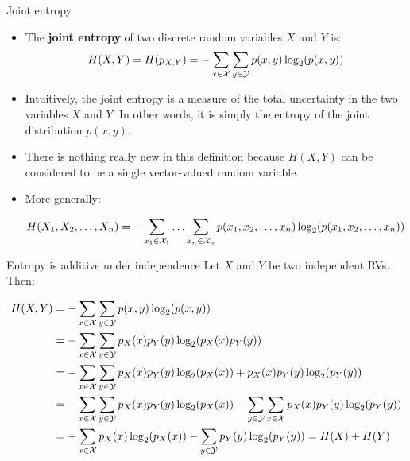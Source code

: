 \begin{vbframe} {Joint entropy}
\begin{itemize}
  \item The \textbf{joint entropy} of two discrete random variables $X$ and $Y$ is:
    $$ H(X,Y) = H(p_{X,Y}) = - \sum_{x \in \mathcal{X}} \sum_{y \in \mathcal{Y}}  p(x,y) \log_2(p(x,y))$$
  \item Intuitively, the joint entropy is a measure of the total uncertainty in the two variables $X$ and $Y$. In other words, it is simply the entropy of the joint distribution $p(x,y)$.
  \item There is nothing really new in this definition because $H(X, Y)$ can be considered to be a single vector-valued random variable.
  \item More generally:
    \begin{footnotesize}  
  $$ H(X_1, X_2, \ldots, X_n) = - \sum_{x_1 \in \mathcal{X}_1} \ldots \sum_{x_n \in \mathcal{X}_n} p(x_1,x_2, \ldots, x_n) \log_2(p(x_1,x_2, \ldots, x_n)) $$ 
    \end{footnotesize}  
\end{itemize}
\end{vbframe}

\begin{vbframe} {Entropy is additive under independence}
Let $X$ and $Y$ be two independent RVs. Then:
  \begin{footnotesize}
  \begin{equation*}
    \begin{aligned} 
     H(X,Y) &= - \sum_{x \in \mathcal{X}} \sum_{y \in \mathcal{Y}}  p(x,y) \log_2(p(x,y)) \\ 
            &= - \sum_{x \in \mathcal{X}} \sum_{y \in \mathcal{Y}}  p_X(x)p_Y(y) \log_2(p_X(x)p_Y(y)) \\
            &= - \sum_{x \in \mathcal{X}} \sum_{y \in \mathcal{Y}}  p_X(x)p_Y(y)\log_2(p_X(x)) + p_X(x)p_Y(y)\log_2(p_Y(y)) \\
            &= - \sum_{x \in \mathcal{X}} \sum_{y \in \mathcal{Y}}  p_X(x)p_Y(y)\log_2(p_X(x)) - \sum_{y \in \mathcal{Y}} \sum_{x \in \mathcal{X}} p_X(x)p_Y(y)\log_2(p_Y(y)) \\
            &= - \sum_{x \in \mathcal{X}} p_X(x)\log_2(p_X(x)) - \sum_{y \in \mathcal{Y}} p_Y(y)\log_2(p_Y(y)) = H(X) + H(Y)
    \end{aligned} 
  \end{equation*}
\end{footnotesize}
\end{vbframe}

